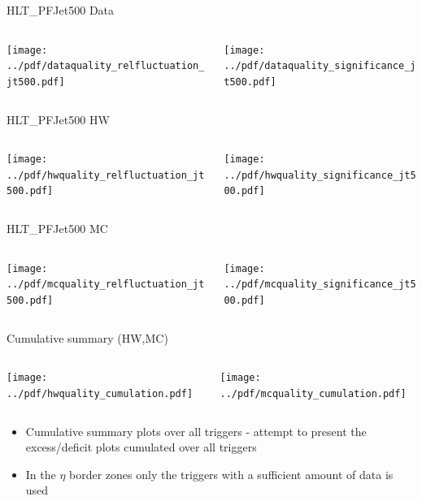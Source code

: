 \documentclass[9pt]{beamer}
\begin{document}
\begin{frame}[t]{HLT\_PFJet500 Data}
\begin{columns}[T]
  \begin{column}{.5\textwidth}
  \texttt{[image: ../pdf/dataquality\_relfluctuation\_jt500.pdf]}
  \end{column}
  \begin{column}{.5\textwidth}
  \texttt{[image: ../pdf/dataquality\_significance\_jt500.pdf]}
  \end{column}
\end{columns}
\end{frame}

\begin{frame}[t]{HLT\_PFJet500 HW}
\begin{columns}[T]
  \begin{column}{.5\textwidth}
  \texttt{[image: ../pdf/hwquality\_relfluctuation\_jt500.pdf]}
  \end{column}
  \begin{column}{.5\textwidth}
  \texttt{[image: ../pdf/hwquality\_significance\_jt500.pdf]}
  \end{column}
\end{columns}
\end{frame}

\begin{frame}[t]{HLT\_PFJet500 MC}
\begin{columns}[T]
  \begin{column}{.5\textwidth}
  \texttt{[image: ../pdf/mcquality\_relfluctuation\_jt500.pdf]}
  \end{column}
  \begin{column}{.5\textwidth}
  \texttt{[image: ../pdf/mcquality\_significance\_jt500.pdf]}
  \end{column}
\end{columns}
\end{frame}

\begin{frame}[t]{Cumulative summary (HW,MC)}
\begin{columns}[T]
  \begin{column}{.5\textwidth}
  \texttt{[image: ../pdf/hwquality\_cumulation.pdf]}
  \end{column}
  \begin{column}{.5\textwidth}
  \texttt{[image: ../pdf/mcquality\_cumulation.pdf]}
  \end{column}
\end{columns}
\begin{itemize}
 \item Cumulative summary plots over all triggers - attempt to present the excess/deficit plots cumulated over all triggers
 \item In the $\eta$ border zones only the triggers with a sufficient amount of data is used
\end{itemize}
\end{frame}
\end{document}
